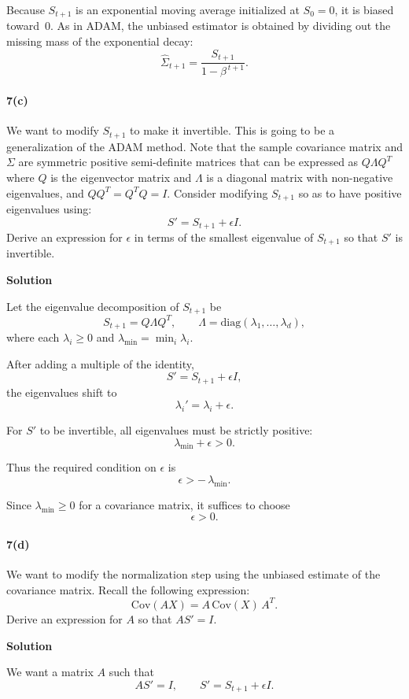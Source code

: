 \documentclass[11pt]{article}
\begin{document}
	Because $S_{t+1}$ is an exponential moving average initialized at $S_0=0$, it is
	biased toward~0.  As in ADAM, the unbiased estimator is obtained by dividing out
	the missing mass of the exponential decay:
	\[
	\hat{\Sigma}_{t+1}
	= \frac{S_{t+1}}{1 - \beta^{\,t+1}}.
	\]

	\paragraph{7(c)} We want to modify $S_{t+1}$ to make it invertible. This is going to be a generalization of the ADAM method. Note that the sample covariance matrix and $\Sigma$ are symmetric positive semi-definite matrices that can be expressed as $Q \Lambda Q^T$ where $Q$ is the eigenvector matrix and $\Lambda$ is a diagonal matrix with non-negative eigenvalues, and $Q Q^T = Q^T Q = I$. Consider modifying $S_{t+1}$ so as to have positive eigenvalues using:
	\[
	S' = S_{t+1} + \epsilon I.
	\]
	Derive an expression for $\epsilon$ in terms of the smallest eigenvalue of $S_{t+1}$ so that $S'$ is invertible.
	
	\noindent\textbf{Solution}
	
	Let the eigenvalue decomposition of $S_{t+1}$ be
	\[
	S_{t+1} = Q \Lambda Q^T,
	\qquad 
	\Lambda = \mathrm{diag}(\lambda_1,\ldots,\lambda_d),
	\]
	where each $\lambda_i \ge 0$ and $\lambda_{\min} = \min_i \lambda_i$.
	
	After adding a multiple of the identity,
	\[
	S' = S_{t+1} + \epsilon I,
	\]
	the eigenvalues shift to
	\[
	\lambda_i' = \lambda_i + \epsilon.
	\]
	
	For $S'$ to be invertible, all eigenvalues must be strictly positive:
	\[
	\lambda_{\min} + \epsilon > 0.
	\]
	
	Thus the required condition on $\epsilon$ is
	\[
	\epsilon > -\,\lambda_{\min}.
	\]
	
	Since $\lambda_{\min}\ge 0$ for a covariance matrix, it suffices to choose
	\[
	\epsilon > 0.
	\]
	
	\paragraph{7(d)} We want to modify the normalization step using the unbiased estimate of the covariance matrix. Recall the following expression:
	\[
	\text{Cov}(A X) = A \, \text{Cov}(X) \, A^T.
	\]
	Derive an expression for $A$ so that $A S' = I$.
	
	\noindent\textbf{Solution}
	
	We want a matrix $A$ such that
	\[
	A S' = I,
	\qquad 
	S' = S_{t+1} + \epsilon I.
	\]
	
\end{document}
